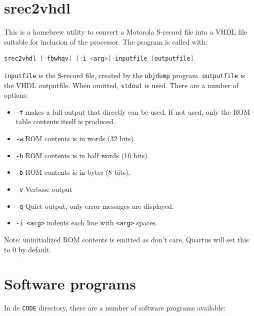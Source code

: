 \documentclass[12pt]{article}
\begin{document}
\section{srec2vhdl}
This is a homebrew utility to convert a Motorola S-record file into a VHDL file suitable for inclusion of the processor. The program is called with:

\begin{lstlisting}[language=c]
srec2vhdl [-fbwhqv] [-i <arg>] inputfile [outputfile]
\end{lstlisting}

\texttt{inputfile} is the S-record file, created by the \texttt{objdump} program. \texttt{outputfile} is the VHDL outputfile. When omitted, \texttt{stdout} is used. There are a number of options:

\begin{itemize}
\item \texttt{-f} makes a full output that directly can be used. If not used, only the ROM table contents itself is produced.
\item \texttt{-w} ROM contents is in words (32 bits).
\item \texttt{-h} ROM contents is in half words (16 bits).
\item \texttt{-b} ROM contents is in bytes (8 bits).
\item \texttt{-v} Verbose output
\item \texttt{-q} Quiet output, only error messages are displayed.
\item \texttt{-i <arg>} indents each line with \texttt{<arg>} spaces.
\end{itemize}

Note: uninitialized ROM contents is emitted as don't care, Quartus will set this to 0 by default.

\section{Software programs}
In de \texttt{CODE} directory, there are a number of software programs available:
\end{document}
